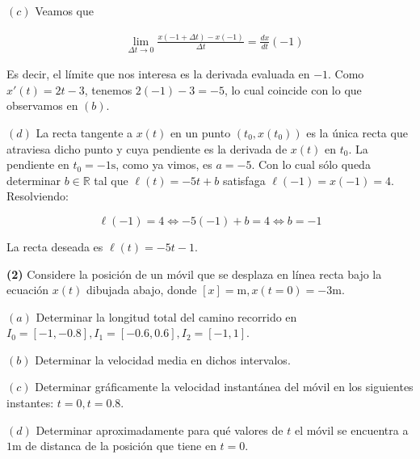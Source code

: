 \documentclass[12pt]{article}
\theoremstyle{definition}
\begin{document}
$(c)$ Veamos que

\begin{align*}
    &\lim_{\Delta t \to 0} \frac{x(-1 + \Delta t) - x(-1)}{\Delta t} =
    \frac{dx}{dt}(-1)
\end{align*}

Es decir, el límite que nos interesa es la derivada evaluada en $-1$. Como 
$x'(t) = 2t - 3$, tenemos $2(-1) - 3 = -5$, lo cual coincide con lo que
observamos en $(b)$.

$(d)$ La recta tangente a $x(t)$ en un punto $(t_0, x(t_0))$ es la única recta
que atraviesa dicho punto y cuya
pendiente es la derivada de $x(t)$ en $t_0$. La pendiente en $t_0 = -1\text{s}$,
como ya vimos, es $a = -5$. Con lo cual sólo queda determinar $b \in \mathbb{R}$
tal que $\ell(t) = -5t + b$ satisfaga $\ell(-1) = x(-1) = 4$. Resolviendo: 

\begin{equation*}
    \ell(-1) = 4 \iff -5(-1) + b = 4 \iff b = -1
\end{equation*}

La recta deseada es $\ell(t) = -5t - 1$.

\pagebreak 

\begin{shaded}
    
\textbf{(2)} Considere la posición de un móvil que se desplaza en línea recta
bajo la ecuación $x(t)$ dibujada abajo, donde $\left[ x \right] = \text{m},
x(t=0) = -3\text{m}$.

$(a)$ Determinar la longitud total del camino recorrido en $I_0 = [-1, -0.8],
I_1=[-0.6, 0.6], I_2 = [-1, 1]$. 

$(b)$ Determinar la velocidad media en dichos intervalos.
 
$(c)$ Determinar gráficamente la velocidad instantánea del móvil en los
siguientes instantes: $t = 0, t  = 0.8$.

$(d)$ Determinar aproximadamente para qué valores de $t$ el móvil se encuentra a
$1$m de distanca de la posición que tiene en $t = 0$.

\end{shaded}
\end{document}
